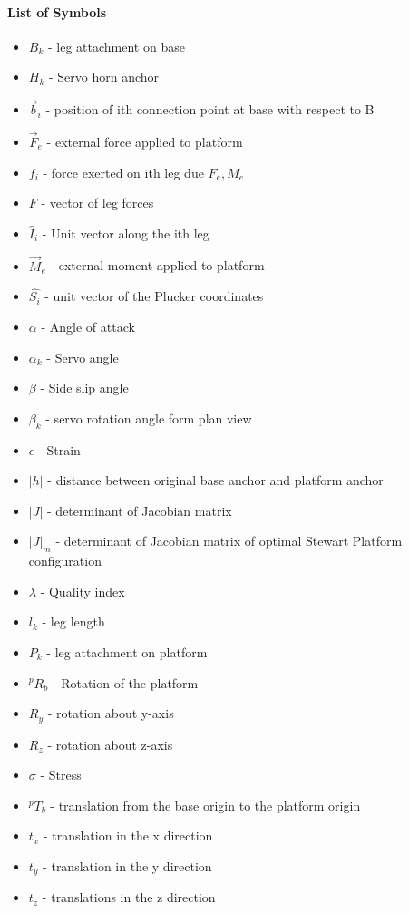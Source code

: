 \paragraph{List of Symbols}
\begin{itemize}
\item $B_{k}$ - leg attachment on base
\item $H_{k}$ - Servo horn anchor
\item $\vec{b}_i$ - position of ith connection point at base with respect to B
\item $\vec{F}_e$ - external force applied to platform
\item $f_i$ - force exerted on ith leg due $F_e, M_e$
\item $F$ - vector of leg forces
\item $\hat{I}_i$ - Unit vector along the ith leg
\item $\vec{M}_e$ - external moment applied to platform
\item $\hat{{S_{i}}}$ - unit vector of the Plucker coordinates
\item $\alpha$ - Angle of attack
\item $\alpha_{k}$ - Servo angle
\item $\beta$ - Side slip angle
\item $\beta_{k}$ - servo rotation angle form plan view
\item $\epsilon$ - Strain
\item $|h|$ - distance between original base anchor and platform anchor
\item $|J|$ - determinant of Jacobian matrix
\item $|J|_{m}$ - determinant of Jacobian matrix of optimal Stewart Platform configuration
\item $\lambda$ - Quality index
\item $l_{k}$ - leg length
\item $P_{k}$ - leg attachment on platform
\item $^{p}R_{b}$ - Rotation of the platform
\item $R_{y}$ - rotation about y-axis
\item $R_{z}$ - rotation about z-axis
\item $\sigma$ - Stress
\item $^{p}T_{b}$ - translation from the base origin to the platform origin
\item $t_{x}$ -  translation in the x direction
\item $t_{y}$ -  translation in the y direction
\item $t_{z} $ -  translations in the z direction
\end{itemize}
\pagebreak